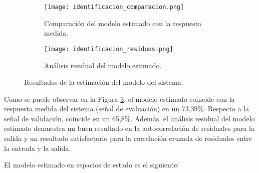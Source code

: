 \begin{figure}[H]
    \centering

    \begin{subfigure}[b]{\textwidth}
        \centering
        \texttt{[image: identificacion\_comparacion.png]}
        \caption{Comparación del modelo estimado con la respuesta medida.}
        \vspace{0.25cm}
        \label{fig:identificacion_comparacio n}
    \end{subfigure}
    \begin{subfigure}[b]{\textwidth}
        \centering
        \texttt{[image: identificacion\_residuos.png]}
        \caption{Análisis residual del modelo estimado.}
        \label{fig:identificacion_residuos}
    \end{subfigure}

    \vspace{-0.25cm}
    \caption{Resultados de la estimación del modelo del sistema.}
    \label{fig:identificacion_resultados}
\end{figure}
\vspace{-0.5cm}

Como se puede observar en la Figura \ref{fig:identificacion_resultados}, el modelo estimado coincide
con la respuesta medida del sistema (señal de evaluación) en un 73,39\%. Respecto a la señal de 
validación, coincide en un 65,8\%. Además, el análisis residual del modelo estimado
demuestra un buen resultado en la autocorrelación de residuales para la salida y un resultado
satisfactorio para la correlación cruzada de residuales entre la entrada y la salida.

El modelo estimado en espacios de estado es el siguiente:

